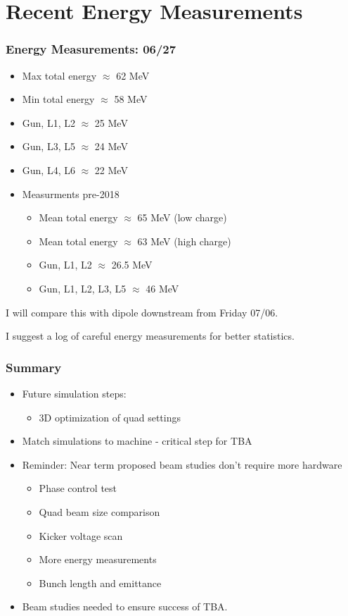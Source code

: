 \documentclass[professionalfonts,t]{beamer}
\begin{document}
\section{Recent Energy Measurements}
\begin{frame}
\frametitle{Energy Measurements: 06/27}
	\begin{itemize}
		\item Max total energy $\approx$ 62 MeV
		\item Min total energy $\approx$ 58 MeV
		\item Gun, L1, L2 $\approx$ 25 MeV
		\item Gun, L3, L5 $\approx$ 24 MeV
		\item Gun, L4, L6 $\approx$ 22 MeV
		\item Measurments pre-2018
		\begin{itemize}
			\item Mean total energy $\approx$ 65 MeV (low charge)
			\item Mean total energy $\approx$ 63 MeV (high charge)
			\item Gun, L1, L2 $\approx$ 26.5 MeV
			\item Gun, L1, L2, L3, L5 $\approx$ 46 MeV
		\end{itemize}
	\end{itemize}
	
	I will compare this with dipole downstream from Friday 07/06.
	
	I suggest a log of careful energy measurements for better statistics.
	
\end{frame}



\begin{frame}
	\frametitle{Summary}
	\begin{itemize}
		\item Future simulation steps:
		\begin{itemize}
			\item 3D optimization of quad settings

		\end{itemize}
		\item Match simulations to machine - critical step for TBA
		\item Reminder: Near term proposed beam studies don't require more hardware
		\begin{itemize}
			\item Phase control test
			\item Quad beam size comparison
			\item Kicker voltage scan
			\item More energy measurements
			\item Bunch length and emittance
		\end{itemize}
		\item Beam studies needed to ensure success of TBA.
		
	\end{itemize}
\end{frame}
\end{document}

